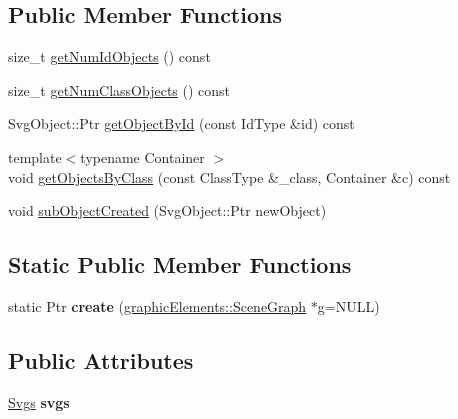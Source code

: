 \subsection*{Public Member Functions}
\begin{DoxyCompactItemize}
\item 
size\_\-t \hyperlink{classsambag_1_1disco_1_1svg_1_1_svg_root_a7a7364f3b0dc222fdc89e86325700f8d}{getNumIdObjects} () const 
\item 
size\_\-t \hyperlink{classsambag_1_1disco_1_1svg_1_1_svg_root_a4c3286360fec06dcc0874ac4b4cadbc5}{getNumClassObjects} () const 
\item 
SvgObject::Ptr \hyperlink{classsambag_1_1disco_1_1svg_1_1_svg_root_a3ec30a0c25f17ebee317b32d73ebd331}{getObjectById} (const IdType \&id) const 
\item 
{\footnotesize template$<$typename Container $>$ }\\void \hyperlink{classsambag_1_1disco_1_1svg_1_1_svg_root_a1d3e0122f0a7aac356acc1f9aa9b1d2c}{getObjectsByClass} (const ClassType \&\_\-class, Container \&c) const 
\item 
void \hyperlink{classsambag_1_1disco_1_1svg_1_1_svg_root_a5af86b505c33e874853d1f53ac4809a9}{subObjectCreated} (SvgObject::Ptr newObject)
\end{DoxyCompactItemize}
\subsection*{Static Public Member Functions}
\begin{DoxyCompactItemize}
\item 
\hypertarget{classsambag_1_1disco_1_1svg_1_1_svg_root_aaa061e4bf23ccfa9c60e3d90afe1b6cb}{
static Ptr {\bfseries create} (\hyperlink{classsambag_1_1disco_1_1graphic_elements_1_1_scene_graph}{graphicElements::SceneGraph} $\ast$g=NULL)}
\label{classsambag_1_1disco_1_1svg_1_1_svg_root_aaa061e4bf23ccfa9c60e3d90afe1b6cb}

\end{DoxyCompactItemize}
\subsection*{Public Attributes}
\begin{DoxyCompactItemize}
\item 
\hypertarget{classsambag_1_1disco_1_1svg_1_1_svg_root_afc6c4451636a6fb6ee6ff4a3261db204}{
\hyperlink{classsambag_1_1disco_1_1svg_1_1_svg_root_a5c09e3b0f6e210ca6780d65e6802cc49}{Svgs} {\bfseries svgs}}
\label{classsambag_1_1disco_1_1svg_1_1_svg_root_afc6c4451636a6fb6ee6ff4a3261db204}

\end{DoxyCompactItemize}


